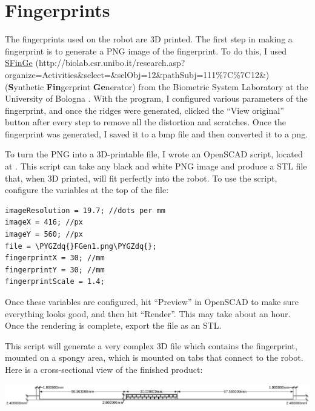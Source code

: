 \documentclass[letterpaper,10pt,english]{sphinxmanual}
\def\PYGZdq{\char`\"}
\begin{document}
\section{Fingerprints}
\label{NARFSTR:fingerprintsection}\label{NARFSTR:fingerprints}
The fingerprints used on the robot are 3D printed. The first step in making a fingerprint is to generate a PNG image of the fingerprint. To do this, I used \href{http://biolab.csr.unibo.it/research.asp?organize=Activities\&select=\&selObj=12\&pathSubj=111\%7C\%7C12\&}{SFinGe} (http://biolab.csr.unibo.it/research.asp?organize=Activities\&select=\&selObj=12\&pathSubj=111\%7C\%7C12\&) (\textbf{S}ynthetic \textbf{Fin}gerprint \textbf{Ge}nerator) from the Biometric System Laboratory at the University of Bologna . With the program, I configured various parameters of the fingerprint, and once the ridges were generated, clicked the ``View original'' button after every step to remove all the distortion and scratches. Once the fingerprint was generated, I saved it to a bmp file and then converted it to a png.

To turn the PNG into a 3D-printable file, I wrote an OpenSCAD script, located at . This script can take any black and white PNG image and produce a STL file that, when 3D printed, will fit perfectly into the robot. To use the script, configure the variables at the top of the file:

\begin{Verbatim}[commandchars=\\\{\}]
imageResolution = 19.7; //dots per mm
imageX = 416; //px
imageY = 560; //px
file = \PYGZdq{}FGen1.png\PYGZdq{};
fingerprintX = 30; //mm
fingerprintY = 30; //mm
fingerprintScale = 1.4;
\end{Verbatim}

Once these variables are configured, hit ``Preview'' in OpenSCAD to make sure everything looks good, and then hit ``Render''. This may take about an hour. Once the rendering is complete, export the file as an STL.

This script will generate a very complex 3D file which contains the fingerprint, mounted on a spongy area, which is mounted on tabs that connect to the robot. Here is a cross-sectional view of the finished product:

\includegraphics{LabeledFingerprint.pdf}
\end{document}
